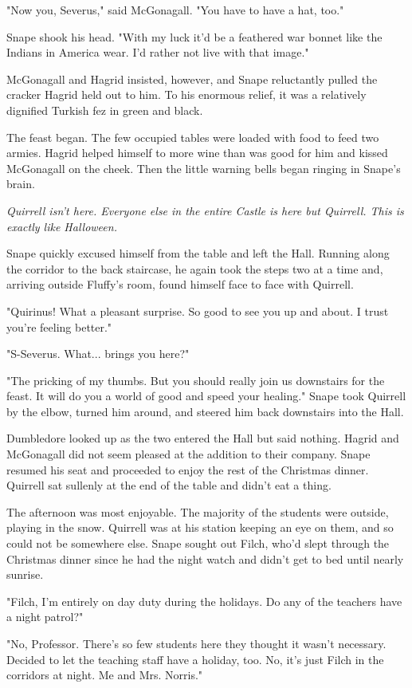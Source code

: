 "Now you, Severus," said McGonagall. "You have to have a hat, too."

Snape shook his head. "With my luck it'd be a feathered war bonnet like the Indians in America wear. I'd rather not live with that image."

McGonagall and Hagrid insisted, however, and Snape reluctantly pulled the cracker Hagrid held out to him. To his enormous relief, it was a relatively dignified Turkish fez in green and black.

The feast began. The few occupied tables were loaded with food to feed two armies. Hagrid helped himself to more wine than was good for him and kissed McGonagall on the cheek. Then the little warning bells began ringing in Snape's brain.

\emph{Quirrell isn't here. Everyone else in the entire Castle is here but Quirrell. This is exactly like Halloween.}

Snape quickly excused himself from the table and left the Hall. Running along the corridor to the back staircase, he again took the steps two at a time and, arriving outside Fluffy's room, found himself face to face with Quirrell.

"Quirinus! What a pleasant surprise. So good to see you up and about. I trust you're feeling better."

"S-Severus. What... brings you here?"

"The pricking of my thumbs. But you should really join us downstairs for the feast. It will do you a world of good and speed your healing." Snape took Quirrell by the elbow, turned him around, and steered him back downstairs into the Hall.

Dumbledore looked up as the two entered the Hall but said nothing. Hagrid and McGonagall did not seem pleased at the addition to their company. Snape resumed his seat and proceeded to enjoy the rest of the Christmas dinner. Quirrell sat sullenly at the end of the table and didn't eat a thing.

The afternoon was most enjoyable. The majority of the students were outside, playing in the snow. Quirrell was at his station keeping an eye on them, and so could not be somewhere else. Snape sought out Filch, who'd slept through the Christmas dinner since he had the night watch and didn't get to bed until nearly sunrise.

"Filch, I'm entirely on day duty during the holidays. Do any of the teachers have a night patrol?"

"No, Professor. There's so few students here they thought it wasn't necessary. Decided to let the teaching staff have a holiday, too. No, it's just Filch in the corridors at night. Me and Mrs. Norris."

